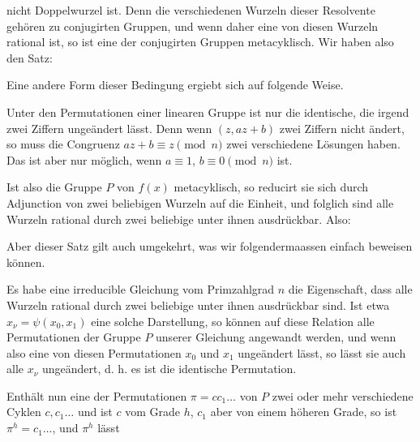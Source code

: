 nicht Doppelwurzel ist. Denn die verschiedenen Wurzeln dieser Resolvente gehören zu conjugirten Gruppen, und wenn daher eine von diesen Wurzeln rational ist, so ist eine der conjugirten Gruppen metacyklisch. Wir haben also den Satz:


Eine andere Form dieser Bedingung ergiebt sich auf folgende Weise.

Unter den Permutationen einer linearen Gruppe ist nur die identische, die irgend zwei Ziffern ungeändert lässt. Denn wenn $(z, az+b)$ zwei Ziffern nicht ändert, so muss die Congruenz $az+b \equiv z \pmod n$ zwei verschiedene Lösungen haben. Das ist aber nur möglich, wenn $a \equiv 1$, $b \equiv 0 \pmod n$ ist.

Ist also die Gruppe $P$ von $f(x)$ metacyklisch, so reducirt sie sich durch Adjunction von zwei beliebigen Wurzeln auf die Einheit, und folglich sind alle Wurzeln rational durch zwei beliebige unter ihnen ausdrückbar. Also:


Aber dieser Satz gilt auch umgekehrt, was wir folgendermaassen einfach beweisen können.

Es habe eine irreducible Gleichung vom Primzahlgrad $n$ die Eigenschaft, dass alle Wurzeln rational durch zwei beliebige unter ihnen ausdrückbar sind. Ist etwa $x_\nu = \psi(x_0, x_1)$ eine solche Darstellung, so können auf diese Relation alle Permutationen der Gruppe $P$ unserer Gleichung angewandt werden, und wenn also eine von diesen Permutationen $x_0$ und $x_1$ ungeändert lässt, so lässt sie auch alle $x_\nu$ ungeändert, d. h. es ist die identische Permutation. 

Enthält nun eine der Permutationen $\pi = cc_1 \ldots$ von $P$ zwei oder mehr verschiedene Cyklen $c, c_1 \ldots$ und ist $c$ vom Grade $h$, $c_1$ aber von einem höheren Grade, so ist $\pi^h = c_1 \ldots$, und $\pi^h$ lässt
